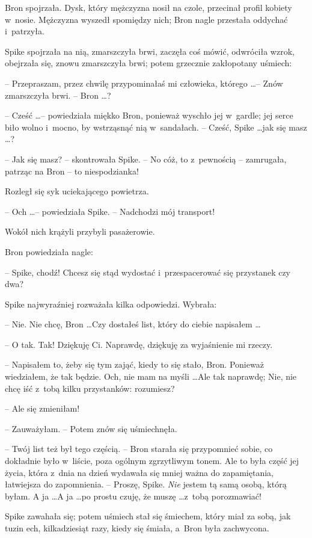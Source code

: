 \documentclass[oneside,polish,11pt,rmheadings]{mwbk}
\begin{document}
Bron spojrzała. Dysk, który mężczyzna nosił na czole, przecinał profil kobiety w~nosie. Mężczyzna wyszedł spomiędzy nich; Bron nagle przestała oddychać i~patrzyła. 

Spike spojrzała na nią, zmarszczyła brwi, zaczęła coś mówić, odwróciła wzrok, obejrzała się, znowu zmarszczyła brwi; potem grzecznie zakłopotany uśmiech: 

-- Przepraszam, przez chwilę przypominałaś mi człowieka, którego \ldots  -- Znów zmarszczyła brwi. -- Bron \ldots ? 

-- Cześć \ldots  -- powiedziała miękko Bron, ponieważ wyschło jej w~gardle; jej serce biło wolno i~mocno, by wstrząsnąć nią w~sandałach. -- Cześć, Spike \ldots  jak się masz \ldots ? 

-- Jak się masz? --  skontrowała Spike. -- No cóż, to z~pewnością -- zamrugała, patrząc na Bron -- to niespodzianka! 

Rozległ się syk uciekającego powietrza. 

-- Och \ldots  -- powiedziała Spike. -- Nadchodzi mój transport! 

Wokół nich krążyli przybyli pasażerowie. 

Bron powiedziała nagle: 

-- Spike, chodź! Chcesz się stąd wydostać i~przespacerować się przystanek czy dwa? 

Spike najwyraźniej rozważała kilka odpowiedzi. Wybrała: 

-- Nie. Nie chcę, Bron \ldots   Czy dostałeś list, który do ciebie napisałem \ldots  

-- O tak. Tak!  Dziękuję Ci. Naprawdę, dziękuję za wyjaśnienie mi rzeczy. 

-- Napisałem to, żeby się tym zająć, kiedy to się stało, Bron. Ponieważ wiedziałem, że tak będzie. Och, nie mam na myśli \ldots  Ale tak naprawdę; Nie, nie chcę iść z~tobą kilku przystanków: rozumiesz? 

-- Ale się zmieniłam! 

 -- Zauważyłam. -- Potem znów się uśmiechnęła. 

-- Twój list też był tego częścią. -- Bron starała się przypomnieć sobie, co dokładnie było w~liście, poza ogólnym zgrzytliwym tonem. Ale to była część jej życia, która z~dnia na dzień wydawała się mniej ważna do zapamiętania, łatwiejsza do zapomnienia. -- Proszę, Spike. \textit{Nie }jestem tą samą osobą, którą byłam. A ja \ldots  A ja \ldots  po prostu czuję, że muszę \ldots  z~tobą porozmawiać!  

Spike zawahała się; potem uśmiech stał się śmiechem, który miał za sobą, jak tuzin ech, kilkadziesiąt razy, kiedy się śmiała, a~Bron była zachwycona. 
\end{document}
